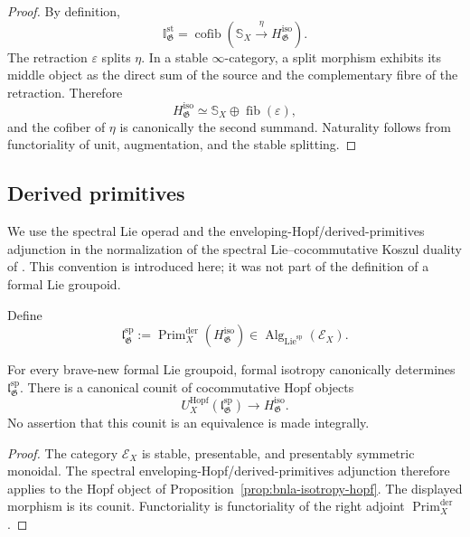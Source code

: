 \begin{proof}
By definition,
\[
    \mathbb I^{\mathrm{st}}_{\mathfrak G}
    =
    \operatorname{cofib}
    \left(
        \mathbb S_X\xrightarrow{\eta}
        H^{\mathrm{iso}}_{\mathfrak G}
    \right).
\]
The retraction $\varepsilon$ splits $\eta$.  In a stable $\infty$-category, a
split morphism exhibits its middle object as the direct sum of the source and
the complementary fibre of the retraction.  Therefore
\[
    H^{\mathrm{iso}}_{\mathfrak G}
    \simeq
    \mathbb S_X\oplus\operatorname{fib}(\varepsilon),
\]
and the cofiber of $\eta$ is canonically the second summand.  Naturality
follows from functoriality of unit, augmentation, and the stable splitting.
\end{proof}

\subsection{Derived primitives}

We use the spectral Lie operad and the enveloping-Hopf/derived-primitives
adjunction in the normalization of the spectral Lie--cocommutative Koszul
duality of \cite{Ching2005,Heine2024}.  This convention is introduced here;
it was not part of the definition of a formal Lie groupoid.

\begin{definition}
\label{def:bnla-spectral-lie-isotropy}
Define
\[
    \mathfrak l^{\mathrm{sp}}_{\mathfrak G}
    :=
    \operatorname{Prim}^{\mathrm{der}}_X
    \left(
        H^{\mathrm{iso}}_{\mathfrak G}
    \right)
    \in
    \operatorname{Alg}_{\mathrm{Lie}^{\mathrm{sp}}}(\mathcal E_X).
\]
\end{definition}

\begin{theorem}
\label{thm:bnla-integral-spectral-isotropy}
For every brave-new formal Lie groupoid, formal isotropy canonically determines
$\mathfrak l^{\mathrm{sp}}_{\mathfrak G}$.  There is a canonical counit of
cocommutative Hopf objects
\[
    U^{\mathrm{Hopf}}_X
    \left(
        \mathfrak l^{\mathrm{sp}}_{\mathfrak G}
    \right)
    \longrightarrow
    H^{\mathrm{iso}}_{\mathfrak G}.
\]
No assertion that this counit is an equivalence is made integrally.
\end{theorem}

\begin{proof}
The category $\mathcal E_X$ is stable, presentable, and presentably symmetric
monoidal.  The spectral enveloping-Hopf/derived-primitives adjunction therefore
applies to the Hopf object of
Proposition~\ref{prop:bnla-isotropy-hopf}.  The displayed morphism is its
counit.  Functoriality is functoriality of the right adjoint
$\operatorname{Prim}^{\mathrm{der}}_X$.
\end{proof}

